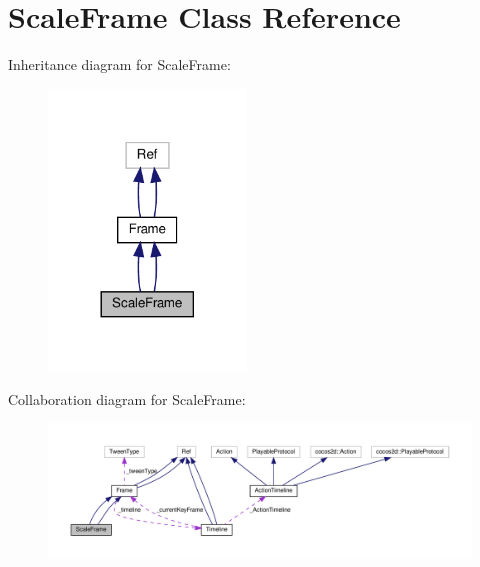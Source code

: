 \hypertarget{classScaleFrame}{}\section{Scale\+Frame Class Reference}
\label{classScaleFrame}


Inheritance diagram for Scale\+Frame\+:
\nopagebreak
\begin{figure}[H]
\begin{center}
\leavevmode
\includegraphics[width=149pt]{classScaleFrame__inherit__graph}
\end{center}
\end{figure}


Collaboration diagram for Scale\+Frame\+:
\nopagebreak
\begin{figure}[H]
\begin{center}
\leavevmode
\includegraphics[width=350pt]{classScaleFrame__coll__graph}
\end{center}
\end{figure}
